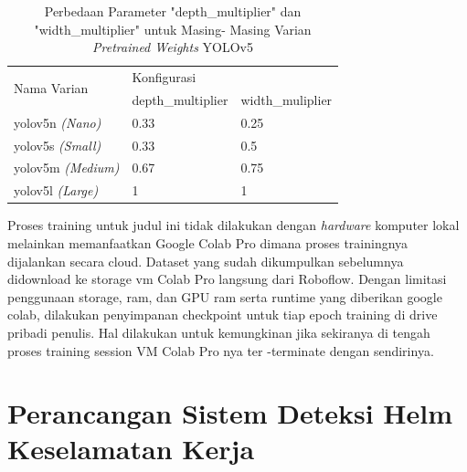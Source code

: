 \begin{longtable}{|l|l|l|} 
  \caption{Perbedaan Parameter "depth\_multiplier" dan "width\_multiplier" untuk Masing- Masing Varian \emph{Pretrained Weights} YOLOv5}
  \label{tb:perbedaanpretrainedyolov5}\\
  \hline
  \multirow{2}{*}{Nama Varian} & \multicolumn{2}{l|}{Konfigurasi}      \\ 
  \cline{2-3}
                               & depth\_multiplier & width\_muliplier  \\ 
  \hline
  yolov5n\textit{ (Nano)}      & 0.33              & 0.25              \\
  yolov5s\textit{ (Small)}     & 0.33              & 0.5               \\
  yolov5m\textit{ (Medium)}    & 0.67              & 0.75              \\
  yolov5l\textit{ (Large)}     & 1                 & 1                 \\
  \hline
\end{longtable}

\par Proses training untuk judul ini tidak dilakukan dengan \emph{hardware} komputer lokal melainkan memanfaatkan Google Colab Pro dimana proses trainingnya dijalankan secara cloud. Dataset yang sudah dikumpulkan sebelumnya didownload ke storage vm Colab Pro langsung dari Roboflow.  Dengan limitasi penggunaan storage, ram, dan GPU ram serta runtime yang diberikan google colab, dilakukan penyimpanan checkpoint untuk tiap epoch training di drive pribadi penulis. Hal dilakukan untuk kemungkinan jika sekiranya di tengah proses training session VM Colab Pro nya ter -terminate dengan sendirinya. 


\section{Perancangan Sistem Deteksi Helm Keselamatan Kerja}
\label{sec:perancangansistem}


